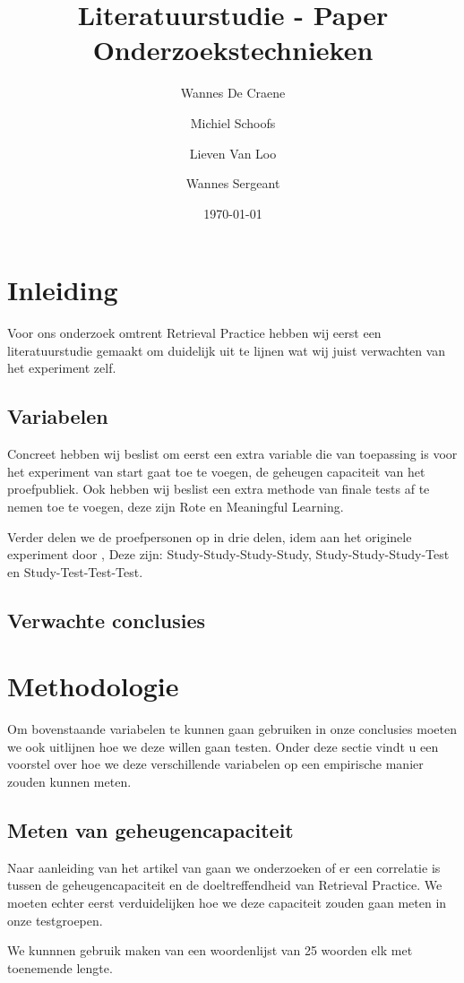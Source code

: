 \documentclass[12pt,a4paper]{article}
\author{Wannes {De Craene} \and Michiel Schoofs \and Lieven {Van Loo} \and Wannes Sergeant}
\title{Literatuurstudie - Paper Onderzoekstechnieken}
\date{\today}
\begin{document}
    
    \maketitle
    
    \tableofcontents

    \newpage
    \section{Inleiding}
    
    Voor ons onderzoek omtrent Retrieval Practice hebben wij eerst een literatuurstudie gemaakt om duidelijk uit te lijnen wat wij juist verwachten van het experiment zelf.
    \subsection{Variabelen}
    Concreet hebben wij beslist om eerst een extra variable die van toepassing is voor het experiment van start gaat toe te voegen, de geheugen capaciteit van het proefpubliek. Ook hebben wij beslist een extra methode van finale tests af te nemen toe te voegen, deze zijn Rote en Meaningful Learning.\\
    \par
	\noindent    
    Verder delen we de proefpersonen op in drie delen, idem aan het originele experiment door \cite{HenryRoediger2006}, Deze zijn: Study-Study-Study-Study, Study-Study-Study-Test  en Study-Test-Test-Test. 
    \subsection{Verwachte conclusies}
    
    \section{Methodologie}
    \label{methodology}
    Om bovenstaande variabelen te kunnen gaan gebruiken in onze conclusies moeten we ook uitlijnen hoe we deze willen gaan testen. Onder deze sectie vindt u een voorstel over hoe we deze verschillende variabelen op een empirische manier zouden kunnen meten.
    
	    \subsection{Meten van geheugencapaciteit}
	    Naar aanleiding van het artikel van \cite{Agarwal2016} gaan we onderzoeken of er een correlatie is tussen de geheugencapaciteit en de doeltreffendheid van Retrieval Practice. We moeten echter eerst verduidelijken hoe we deze capaciteit zouden gaan meten in onze testgroepen.\\
	    \par
	    \noindent
	    We kunnnen gebruik maken van een woordenlijst van 25 woorden elk met toenemende lengte.
	    
\end{document}
